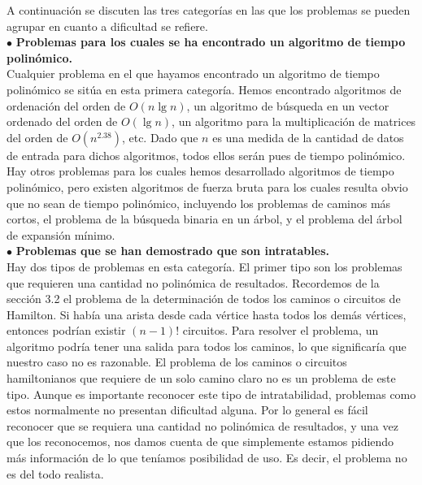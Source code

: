 A continuación se discuten las tres categorías en las que los problemas se pueden agrupar en cuanto a dificultad se refiere.\\

$\bullet$ \textbf{Problemas para los cuales se ha encontrado un algoritmo de tiempo polinómico.}\\

Cualquier problema en el que hayamos encontrado un algoritmo de tiempo polinómico se sitúa en esta primera categoría. Hemos encontrado algoritmos de ordenación del orden de $O(n \lg n)$, un algoritmo de búsqueda en un vector ordenado del orden de $O(\lg n)$, un algoritmo para la multiplicación de matrices del orden de $O(n^{2.38})$, etc. Dado que $n$ es una medida de la cantidad de datos de entrada para dichos algoritmos, todos ellos serán pues de tiempo polinómico. Hay otros problemas para los cuales hemos desarrollado algoritmos de tiempo polinómico, pero existen algoritmos de fuerza bruta para los cuales resulta obvio que no sean de tiempo polinómico, incluyendo los problemas de caminos más cortos, el problema de la búsqueda binaria en un árbol, y el problema del árbol de expansión mínimo.\\

$\bullet$ \textbf{Problemas que se han demostrado que son intratables.}\\

Hay dos tipos de problemas en esta categoría. El primer tipo son los problemas que requieren una cantidad no polinómica de resultados. Recordemos de la sección 3.2 el problema de la determinación de todos los caminos o circuitos de Hamilton. Si había una arista desde cada vértice hasta todos los demás vértices, entonces podrían existir $(n - 1)!$ circuitos. Para resolver el problema, un algoritmo podría tener una salida para todos los caminos, lo que significaría que nuestro caso no es razonable. El problema de los caminos o circuitos hamiltonianos que requiere de un solo camino claro no es un problema de este tipo. Aunque es importante reconocer este tipo de intratabilidad, problemas como estos normalmente no presentan dificultad alguna. Por lo general es fácil reconocer que se requiera una cantidad no polinómica de resultados, y una vez que los reconocemos, nos damos cuenta de que simplemente estamos pidiendo más información de lo que teníamos posibilidad de uso. Es decir, el problema no es del todo realista.\\

